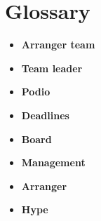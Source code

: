 \section{Glossary}
\begin{itemize}
	\item \textbf{Arranger team}\\
	\item \textbf{Team leader}\\
	\item \textbf{Podio}\\
	\item \textbf{Deadlines}\\
	\item \textbf{Board}\\
	\item \textbf{Management}\\
	\item \textbf{Arranger}\\
	\item \textbf{Hype}\\
\end{itemize}